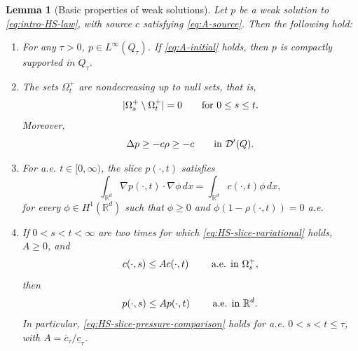 \documentclass[11pt]{amsart}
\numberwithin{equation}{section}
\numberwithin{figure}{section}
\theoremstyle{plain}
\newtheorem{lem}[thm]{Lemma}
\theoremstyle{definition}
\theoremstyle{remark}
\theoremstyle{plain}
\newcommand{\abs}[1]{\lvert #1 \rvert}
\def\R{\mathbb{R}}
\begin{document}
\begin{lem}[Basic properties of weak solutions]\label{lem:HS-basic-properties}
Let \(p\) be a weak solution to \eqref{eq:intro-HS-law}, with source \(c\)
satisfying \eqref{eq:A-source}. Then the following
hold:
\begin{enumerate}[label=(\roman*)]
\item For any $\tau>0$, \(p\in L^\infty(Q_{\tau})\).  If \eqref{eq:A-initial}
holds, then \(p\) is compactly supported in \(Q_{\tau}\).
\item The sets \(\Omega_t^{+}\) are nondecreasing up to null sets, that is,
\begin{equation}\label{eq:HS-monotone-sets}
    \abs{\Omega_s^{+}\setminus\Omega_t^{+}}=0
    \qquad\hbox{for }0\leq s\leq t.
\end{equation}
Moreover,
\begin{equation}\label{eq:HS-lower-laplacian-bound}
    \Delta p\geq -c\rho\geq -c
    \qquad\hbox{in }\mathcal D'(Q).
\end{equation}
\item For a.e. \(t\in[0,\infty)\), the slice \(p(\cdot,t)\) satisfies
\begin{equation}\label{eq:HS-slice-variational}
    \int_{\R^d}\nabla p(\cdot,t)\cdot\nabla\phi\,dx
    =
    \int_{\R^d}c(\cdot,t)\phi\,dx,
\end{equation}
for every  \(\phi\in H^1(\R^d)\) such that $\phi\geq 0$ and
\(\phi(1-\rho(\cdot,t))=0\) a.e.
\item If \(0<s<t<\infty\) are two times for which
\eqref{eq:HS-slice-variational} holds, \(A\geq0\), and
\begin{equation}\label{eq:HS-source-slice-comparison}
    c(\cdot,s)\leq Ac(\cdot,t)
    \qquad\hbox{ a.e. in }\Omega_s^{+} ,
\end{equation}
then
\begin{equation}\label{eq:HS-slice-pressure-comparison}
    p(\cdot,s)\leq Ap(\cdot,t)
    \qquad\hbox{ a.e. in  } \R^d .
\end{equation}
In particular, \eqref{eq:HS-slice-pressure-comparison} holds
for a.e. \(0<s<t\leq\tau\), with \(A=\overline c_\tau/\underline c_\tau\).
\end{enumerate}
\end{lem}
\end{document}
